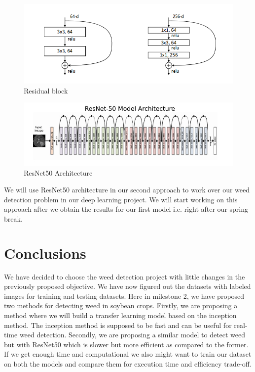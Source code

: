 \documentclass{report}
\begin{document}
\begin{figure}[H]
    \centering
    \includegraphics[width=\textwidth]{ResNetBlock.png}
    \caption{Residual block }
    \label{fig:ResidualBlock}
\end{figure}


\begin{figure}[H]
    \centering
    \includegraphics[width=\textwidth]{ResNet50.jpg}
    \caption{ResNet50 Architecture}
    \label{fig:ResNet50}
\end{figure}

We will use ResNet50 architecture in our second approach to work over our weed detection problem in our deep learning project. We will start working on this approach after we obtain the results for our first model i.e. right after our spring break.


\section{Conclusions}

We have decided to choose the weed detection project with little changes in the previously proposed objective. We have now figured out the datasets with labeled images for training and testing datasets. Here in milestone 2, we have proposed two methods for detecting weed in soybean crops. Firstly, we are proposing a method where we will build a transfer learning model based on the inception method. The inception method is supposed to be fast and can be useful for real-time weed detection. Secondly, we are proposing a similar model to detect weed but with ResNet50 which is slower but more efficient as compared to the former. If we get enough time and computational we also might want to train our dataset on both the models and compare them for execution time and efficiency trade-off.
\end{document}
